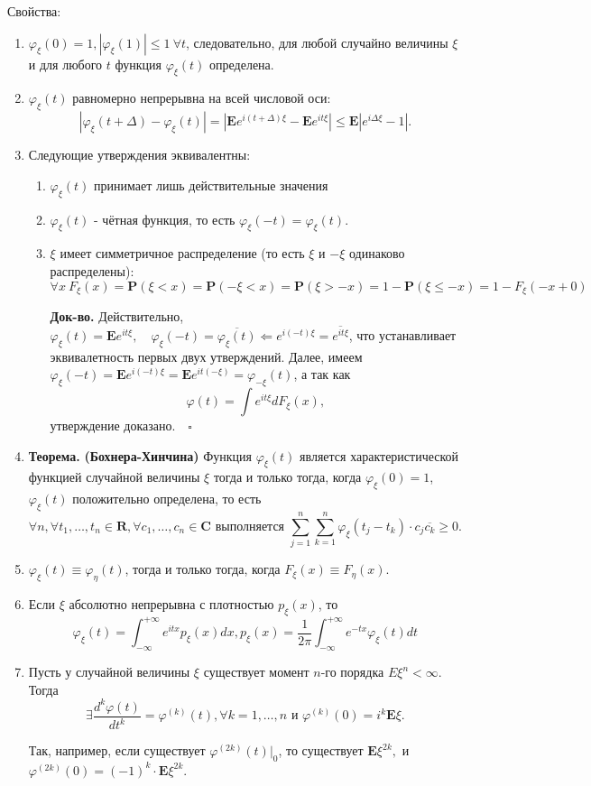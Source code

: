 \documentclass[oneside,final,14pt]{extreport}
\newcommand\myth{{\bf Теорема.}}
\newcommand\myqed{{\bf Док-во.}}
\theoremstyle{definition}
\begin{document}
Свойства:
\begin{enumerate}
    \item $\varphi_\xi(0) = 1, |\varphi_\xi(1)| \leqslant 1~\forall t$, следовательно, для любой случайно величины $\xi$ и для любого $t$ функция $\varphi_\xi(t)$ определена.
    \item $\varphi_\xi(t)$ равномерно непрерывна на всей числовой оси:
    $$\left|\varphi_{\xi}(t+\Delta)-\varphi_{\xi}(t)\right|=\left|\mathbf{E} e^{i(t+\Delta) \xi}-\mathbf{E} e^{i t \xi}\right| \leq \mathbf{E}\left|e^{i \Delta \xi}-1\right|.$$
    \item Следующие утверждения эквивалентны:
    \begin{enumerate}
        \item $\varphi_\xi(t)$ принимает лишь действительные значения
        \item $\varphi_\xi(t)$ - чётная функция, то есть $\varphi_\xi(-t) = \varphi_\xi(t).$
        \item $\xi$ имеет симметричное распределение (то есть $\xi$ и $-\xi$ одинаково распределены):
        $$\forall x~F_{\xi}(x)=\mathbf{P}(\xi<x)=\mathbf{P}(-\xi<x)=\mathbf{P}(\xi>-x)=1-\mathbf{P}(\xi \leq-x)=1-F_{\xi}(-x+0)$$
        
        \myqed{} Действительно, $\varphi_{\xi}(t)=\mathbf{E} e^{i t \xi}, \quad \varphi_{\xi}(-t)=\overline{\varphi_{\xi}(t)} \Leftarrow e^{i(-t) \xi}=\overline{e^{i t \xi}}$, что устанавливает эквивалетность первых двух утверждений. Далее, имеем $\varphi_{\xi}(-t)=\mathbf{E} e^{i(-t) \xi}=\mathbf{E} e^{i t(-\xi)}=\varphi_{-\xi}(t)$, а так как $$\varphi(t)=\int e^{i t \xi} d F_{\xi}(x),$$ утверждение доказано. $~~~\square$
    \end{enumerate}
    
    \item \myth{} \textbf{(Бохнера-Хинчина)} Функция $\varphi_\xi(t)$ является характеристической функцией случайной величины $\xi$ тогда и только тогда, когда $\varphi_\xi(0) = 1$, $\varphi_\xi(t)$ положительно определена, то есть $$\forall n, \forall t_{1}, \ldots, t_{n} \in \mathbf{R}, \forall c_{1}, \ldots, c_{n} \in \mathbf{C} \text { выполняется } \sum_{j=1}^{n} \sum_{k=1}^{n} \varphi_{\xi}\left(t_{j}-t_{k}\right) \cdot c_{j} \overline{c_{k}} \geq 0.$$
    
    \item $\varphi_{\xi}(t) \equiv \varphi_{\eta}(t)$, тогда и только тогда, когда $F_\xi(x) \equiv F_\eta(x).$
    \item Если $\xi$ абсолютно непрерывна с плотностью $p_\xi(x)$, то
    $$\varphi_{\xi}(t)=\int_{-\infty}^{+\infty} e^{i t x} p_{\xi}(x) d x, p_{\xi}(x)=\frac{1}{2 \pi} \int_{-\infty}^{+\infty} e^{-t x} \varphi_{\xi}(t) d t$$
    \item Пусть у случайной величины $\xi$ существует момент $n$-го порядка $E \xi^{n}<\infty$. Тогда
    $$\exists \frac{d^{k} \varphi(t)}{d t^{k}}=\varphi^{(k)}(t), \forall k=1, \ldots, n \text { и } \varphi^{(k)}(0)=i^{k} \mathbf{E} \xi.$$
    
    Так, например, если существует $\varphi^{(2k)}(t)|_0$, то существует $\mathbf{E} \xi^{2 k},$ и $\varphi^{(2 k)}(0)=(-1)^{k} \cdot \mathbf{E} \xi^{2 k}$.
\end{enumerate}
\end{document}
